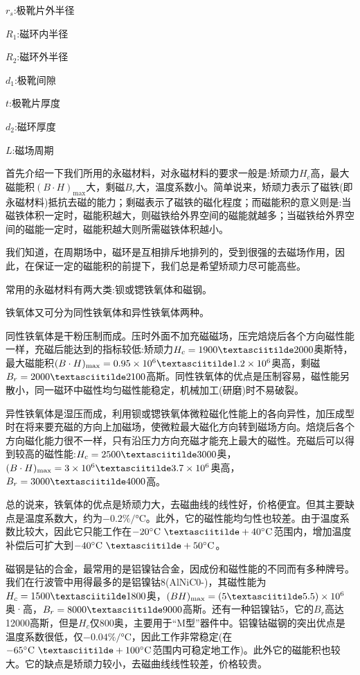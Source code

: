 $ r_s $:极靴片外半径

$ R_1 $:磁环内半径

$ R_2 $:磁环外半径

$ d_1 $:极靴间隙

$ t $:极靴片厚度

$ d_2 $:磁环厚度

$ L $:磁场周期


首先介绍一下我们所用的永磁材料，对永磁材料的要求一般是:矫顽力$ H_c $高，最大磁能积$ (B\cdot H)_\textrm{max} $大，剩磁$ B_r $大，温度系数小。简单说来，矫顽力表示了磁铁(即永磁材料)抵抗去磁的能力；剩磁表示了磁铁的磁化程度；而磁能积的意义则是:当磁铁体积一定时，磁能积越大，则磁铁给外界空间的磁能就越多；当磁铁给外界空间的磁能一定时，磁能积越大则所需磁铁体积越小。

我们知道，在周期场中，磁环是互相排斥地排列的，受到很强的去磁场作用，因此，在保证一定的磁能积的前提下，我们总是希望矫顽力尽可能高些。

常用的永磁材料有两大类:钡或锶铁氧体和磁钢。

铁氧体又可分为同性铁氧体和异性铁氧体两种。

同性铁氧体是干粉压制而成。压时外面不加充磁磁场，压完焙烧后各个方向磁性能一样，充磁后能达到的指标较低:矫顽力$ H_c = 1900\textasciitilde 2000 $奥斯特，最大磁能积$ (B\cdot H)_\textrm{max} = 0.95\times 10^6 \textasciitilde 1.2\times 10^6$奥高，剩磁$ B_r = 2000\textasciitilde 2100 $高斯。同性铁氧体的优点是压制容易，磁性能另散小，同一磁环中磁性均匀磁性能稳定，机械加工(研磨)时不易破裂。

异性铁氧体是湿压而成，利用钡或锶铁氧体微粒磁化性能上的各向异性，加压成型时在将来要充磁的方向上加磁场，使微粒最大磁化方向转到磁场方向。焙烧后各个方向磁化能力很不一样，只有沿压力方向充磁才能充上最大的磁性。充磁后可以得到较高的磁性能:$ H_c = 2500\textasciitilde 3000 $奥，$ (B\cdot H)_\textrm{max} = 3\times 10^6 \textasciitilde 3.7\times 10^6$奥高，$ B_r = 3000\textasciitilde 4000 $高。

总的说来，铁氧体的优点是矫顽力大，去磁曲线的线性好，价格便宜。但其主要缺点是温度系数大，约为$ -0.2 \%/\si{\degreeCelsius}$。此外，它的磁性能均匀性也较差。由于温度系数比较大，因此它只能工作在$ -20\si{\degreeCelsius}~\textasciitilde +40\si{\degreeCelsius} $范围内，增加温度补偿后可扩大到$ -40\si{\degreeCelsius}~\textasciitilde +50\si{\degreeCelsius} $。

磁钢是钻的合金，最常用的是铝镍钴合金，因成份和磁性能的不同而有多种牌号。我们在行波管中用得最多的是铝镍钴8(AlNiC0-\uppercase\expandafter{})，其磁性能为$ H_c = 1500\textasciitilde 1800 $奥，$ (BH)_\textrm{max} = (5\textasciitilde 5.5)\times 10^6$奥·高，$ B_r = 8000\textasciitilde 9000 $高斯。还有一种铝镍钴5，它的$ B_r $高达12000高斯，但是$ H_c $仅800奥，主要用于“M型”器件中。铝镍钴磁钢的突出优点是温度系数很低，仅$ -0.04 \%/\si{\degreeCelsius}$，因此工作非常稳定(在$ -65\si{\degreeCelsius}~\textasciitilde +100\si{\degreeCelsius} $范围内可稳定地工作)。此外它的磁能积也较大。它的缺点是矫顽力较小，去磁曲线线性较差，价格较贵。


